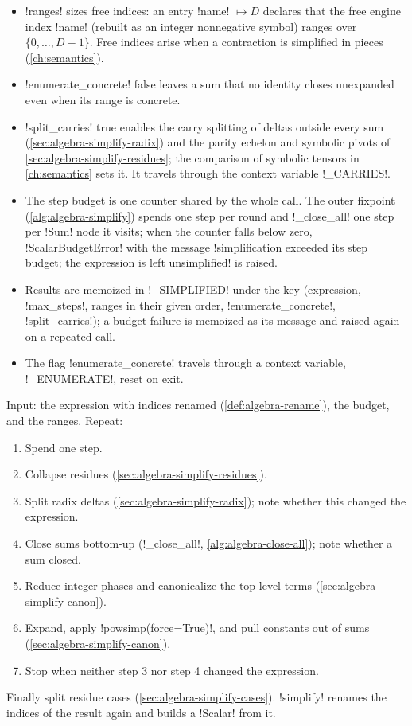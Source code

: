 \begin{itemize}
\item \code!ranges! sizes free indices: an entry \code!name! $\mapsto D$ declares that the free engine index \code!name! (rebuilt as an integer nonnegative symbol) ranges over $\{0,\ldots,D-1\}$. Free indices arise when a contraction is simplified in pieces (\cref{ch:semantics}).
\item \code!enumerate_concrete! false leaves a sum that no identity closes unexpanded even when its range is concrete.
\item \code!split_carries! true enables the carry splitting of deltas outside every sum (\cref{sec:algebra-simplify-radix}) and the parity echelon and symbolic pivots of \cref{sec:algebra-simplify-residues}; the comparison of symbolic tensors in \cref{ch:semantics} sets it. It travels through the context variable \py!_CARRIES!.
\item The step budget is one counter shared by the whole call. The outer fixpoint (\cref{alg:algebra-simplify}) spends one step per round and \py!_close_all! one step per \py!Sum! node it visits; when the counter falls below zero, \py!ScalarBudgetError! with the message \code!simplification exceeded its step budget; the expression is left unsimplified! is raised.
\item Results are memoized in \py!_SIMPLIFIED! under the key (expression, \code!max_steps!, ranges in their given order, \code!enumerate_concrete!, \code!split_carries!); a budget failure is memoized as its message and raised again on a repeated call.
\item The flag \code!enumerate_concrete! travels through a context variable, \py!_ENUMERATE!, reset on exit.
\end{itemize}

\begin{algorithm}\label{alg:algebra-simplify}
Input: the expression with indices renamed (\cref{def:algebra-rename}), the budget, and the ranges. Repeat:
\begin{enumerate}
\item Spend one step.
\item Collapse residues (\cref{sec:algebra-simplify-residues}).
\item Split radix deltas (\cref{sec:algebra-simplify-radix}); note whether this changed the expression.
\item Close sums bottom-up (\py!_close_all!, \cref{alg:algebra-close-all}); note whether a sum closed.
\item Reduce integer phases and canonicalize the top-level terms (\cref{sec:algebra-simplify-canon}).
\item Expand, apply \py!powsimp(force=True)!, and pull constants out of sums (\cref{sec:algebra-simplify-canon}).
\item Stop when neither step 3 nor step 4 changed the expression.
\end{enumerate}
Finally split residue cases (\cref{sec:algebra-simplify-cases}). \py!simplify! renames the indices of the result again and builds a \py!Scalar! from it.
\end{algorithm}

